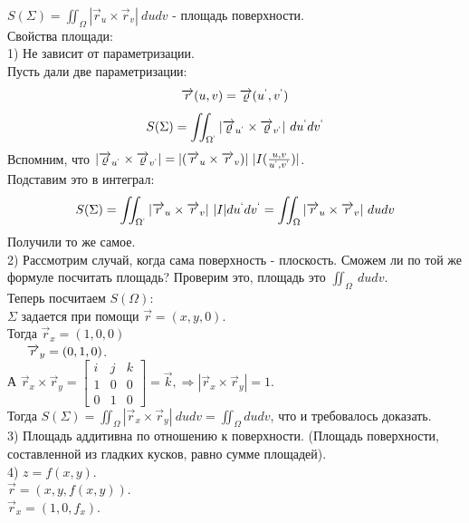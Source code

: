 \documentclass[12pt]{article}
\begin{document}
$S(\Sigma) = \iint_\Omega |\overrightarrow{r}_u \times \overrightarrow{r}_v| \ du dv$ - площадь поверхности.\\
Свойства площади:\\
1) Не зависит от параметризации.\\
Пусть дали две параметризации:\\
$$\overrightarrow{r}(u,v) = \overrightarrow{\varrho}(u^{`},v^{`})$$
$$S(\Sigma) = \iint_{\Omega^{`}} |\overrightarrow{\varrho}_{u^{`}} \times \overrightarrow{\varrho}_{v^{`}}| \ du^{`} dv^{`}$$
Вспомним, что $|\overrightarrow{\varrho}_{u^{`}} \times \overrightarrow{\varrho}_{v^{`}}| = |(\overrightarrow{r}_u \times \overrightarrow{r}_v)| \ |I(\frac{u,v}{u^{`},v^{`}})|$.\\
Подставим это в интеграл:\\
$$S(\Sigma) = \iint_{\Omega^{`}} |\overrightarrow{r}_u \times \overrightarrow{r}_v| \ |I| du^{`} dv^{`} = \iint_\Omega |\overrightarrow{r}_u \times \overrightarrow{r}_v| \ dudv$$
Получили то же самое.\\
2) Рассмотрим случай, когда сама поверхность - плоскость. Сможем ли по той же формуле посчитать площадь? Проверим это, площадь это $\iint_\Omega \ dudv$.\\
Теперь посчитаем $S(\Omega):$\\
$\Sigma$ задается при помощи $\overrightarrow{r} = (x,y,0)$.\\
Тогда $\overrightarrow{r}_x = (1,0,0)$\\
$\indent \overrightarrow{r}_y = (0,1,0)$.\\
А $\overrightarrow{r}_x \times \overrightarrow{r}_y = \begin{bmatrix} i & j & k \\ 1 & 0 & 0 \\ 0 & 1 & 0 \end{bmatrix} = \overrightarrow{k}, \Rightarrow |\overrightarrow{r}_x \times \overrightarrow{r}_y | = 1$.\\
Тогда $S(\Sigma) = \iint_\Omega |\overrightarrow{r}_x \times \overrightarrow{r}_y| \ du dv = \iint_\Omega du dv$, что и требовалось доказать.\\
3) Площадь аддитивна по отношению к поверхности. (Площадь поверхности, составленной из гладких кусков, равно сумме площадей).\\
4) $z = f(x,y)$.\\
$\overrightarrow{r} = (x,y,f(x,y))$.\\
$\overrightarrow{r}_x = (1,0,f_x)$.\\
\end{document}
